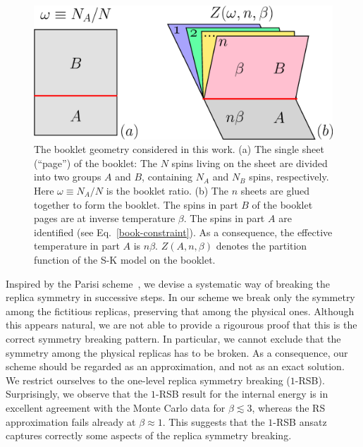 \documentclass[twocolumn,superscriptaddress,prb,10pt]{revtex4-1}
\begin{document}
\begin{figure}[t]
\includegraphics*[width=0.93\linewidth]{./draft_figs/cartoon}
\caption{ The booklet geometry considered in this work. (a) The single sheet 
 (``page'') of the booklet: The $N$ spins living on the sheet are divided into 
 two groups $A$ and $B$, containing $N_A$ and $N_B$ spins, respectively. Here 
 $\omega\equiv N_A/N$ is the booklet ratio. (b) The $n$ sheets are glued together 
 to form the booklet. The spins in part $B$ of the booklet pages are at inverse 
 temperature $\beta$. The spins in part $A$ are identified  (see Eq.~\eqref{book-constraint}). 
 As a consequence, the effective temperature in part $A$ is $n\beta$. 
 $Z(A,n,\beta)$ denotes the partition function of the S-K model on 
 the booklet. 
}
\label{cartoon}
\end{figure}

Inspired by the Parisi scheme~\cite{parisi-1979}, we devise a systematic way of breaking 
the replica symmetry in successive steps. In our scheme we break only the symmetry among 
the fictitious replicas, preserving that among the physical ones. Although this appears 
natural, we are not able to provide a rigourous proof that this is the correct symmetry 
breaking pattern. In particular, we cannot exclude that the symmetry among the physical 
replicas has to be broken. As a consequence, our scheme should be regarded as an 
approximation, and not as an exact solution. We restrict ourselves to the 
one-level replica symmetry breaking ($1$-RSB). 
Surprisingly, we observe that the $1$-RSB result for the internal energy is in 
excellent agreement with the Monte Carlo data for  $\beta\lesssim 3$, whereas the RS 
approximation fails already at $\beta\approx 1$. This suggests that the $1$-RSB ansatz 
captures correctly some aspects of the replica symmetry breaking. 
\end{document}
